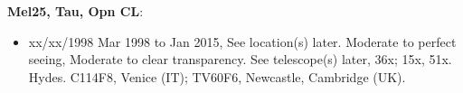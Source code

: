 {\bf Mel25, Tau, Opn CL}:
\begin{itemize}
\item xx/xx/1998 Mar 1998 to Jan 2015, See location(s) later. Moderate to perfect seeing, Moderate to clear transparency. See telescope(s) later, 36x; 15x, 51x. Hydes. C114F8, Venice (IT); TV60F6, Newcastle, Cambridge (UK).
\end{itemize}
